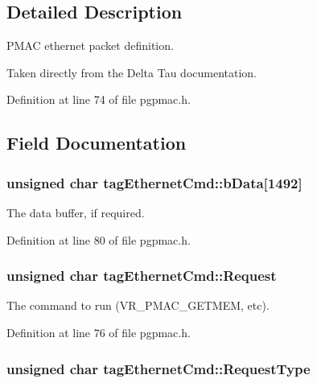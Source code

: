 \subsection{Detailed Description}
P\-M\-A\-C ethernet packet definition. 

Taken directly from the Delta Tau documentation. 

Definition at line 74 of file pgpmac.\-h.



\subsection{Field Documentation}
\hypertarget{structtagEthernetCmd_a872dab798127d6f589974a79c5d0aef1}{
\subsubsection[{b\-Data}]{\setlength{\rightskip}{0pt plus 5cm}unsigned char tag\-Ethernet\-Cmd\-::b\-Data\mbox{[}1492\mbox{]}}}\label{structtagEthernetCmd_a872dab798127d6f589974a79c5d0aef1}


The data buffer, if required. 



Definition at line 80 of file pgpmac.\-h.

\hypertarget{structtagEthernetCmd_a0dc566e7edbb226f1a4ea443d93d56e2}{
\subsubsection[{Request}]{\setlength{\rightskip}{0pt plus 5cm}unsigned char tag\-Ethernet\-Cmd\-::\-Request}}\label{structtagEthernetCmd_a0dc566e7edbb226f1a4ea443d93d56e2}


The command to run (V\-R\-\_\-\-P\-M\-A\-C\-\_\-\-G\-E\-T\-M\-E\-M, etc). 



Definition at line 76 of file pgpmac.\-h.

\hypertarget{structtagEthernetCmd_a6a155eb3ae546dd29369c4a33ddb3310}{
\subsubsection[{Request\-Type}]{\setlength{\rightskip}{0pt plus 5cm}unsigned char tag\-Ethernet\-Cmd\-::\-Request\-Type}}\label{structtagEthernetCmd_a6a155eb3ae546dd29369c4a33ddb3310}


